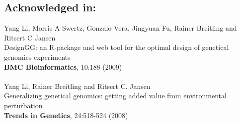 \documentclass[8pt, twoside, a5paper]{report}
\newcommand{\authors}[1]{\small{#1}}
\newcommand{\bold}[1]{{\bfseries #1}}
\begin{document}
\subsection*{Acknowledged in:}
  \authors{Yang Li, Morris A Swertz, Gonzalo Vera, Jingyuan Fu, Rainer Breitling and Ritsert C Jansen}\\
  DesignGG: an R-package and web tool for the optimal design of genetical genomics experiments\\
  \bold{BMC Bioinformatics}, 10:188 (2009)\\\\
  \authors{Yang Li, Rainer Breitling and Ritsert C. Jansen}\\
  Generalizing genetical genomics: getting added value from environmental perturbation\\
  \bold{Trends in Genetics}, 24:518-524 (2008)



\end{document}
